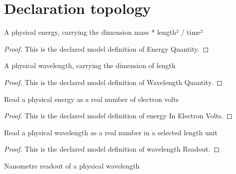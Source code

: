 \section{Declaration topology}
\begin{definition}
  \label{def:physics:phyx-mini-0586:phyxminiproblems-problemphyxmini0586-energyquantity}
  A physical energy, carrying the dimension mass * length² / time²
\end{definition}
\begin{proof}
  This is the declared model definition of Energy Quantity.
\end{proof}
\begin{definition}
  \label{def:physics:phyx-mini-0586:phyxminiproblems-problemphyxmini0586-wavelengthquantity}
  A physical wavelength, carrying the dimension of length
\end{definition}
\begin{proof}
  This is the declared model definition of Wavelength Quantity.
\end{proof}
\begin{definition}
  \label{def:physics:phyx-mini-0586:phyxminiproblems-problemphyxmini0586-energyinelectronvolts}
  Read a physical energy as a real number of electron volts
\end{definition}
\begin{proof}
  This is the declared model definition of energy In Electron Volts.
\end{proof}
\begin{definition}
  \label{def:physics:phyx-mini-0586:phyxminiproblems-problemphyxmini0586-wavelengthreadout}
  Read a physical wavelength as a real number in a selected length unit
\end{definition}
\begin{proof}
  This is the declared model definition of wavelength Readout.
\end{proof}
\begin{definition}
  \label{def:physics:phyx-mini-0586:phyxminiproblems-problemphyxmini0586-wavelengthinnanometers}
  Nanometre readout of a physical wavelength
\end{definition}

